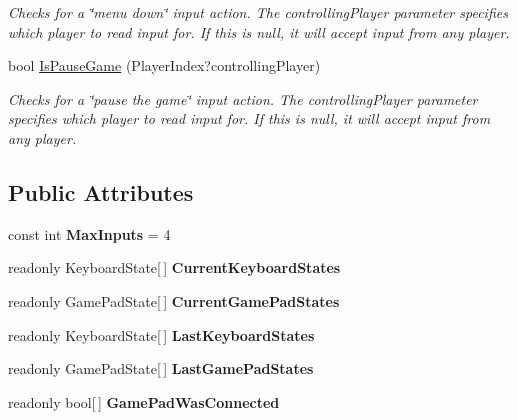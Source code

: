 \begin{DoxyCompactItemize}
\begin{DoxyCompactList}\small\item\em Checks for a \char`\"{}menu down\char`\"{} input action. The controllingPlayer parameter specifies which player to read input for. If this is null, it will accept input from any player. \item\end{DoxyCompactList}\item 
bool \hyperlink{classCityMania_1_1InputState_a3bd8bfe8eb38e6a6730104b22965a752}{IsPauseGame} (PlayerIndex?controllingPlayer)
\begin{DoxyCompactList}\small\item\em Checks for a \char`\"{}pause the game\char`\"{} input action. The controllingPlayer parameter specifies which player to read input for. If this is null, it will accept input from any player. \item\end{DoxyCompactList}\end{DoxyCompactItemize}
\subsection*{Public Attributes}
\begin{DoxyCompactItemize}
\item 
\hypertarget{classCityMania_1_1InputState_ac78cfe30d434938078907e0d40e47aaf}{
const int {\bfseries MaxInputs} = 4}
\label{classCityMania_1_1InputState_ac78cfe30d434938078907e0d40e47aaf}

\item 
\hypertarget{classCityMania_1_1InputState_a5edcfb328a0feb8dcafa0c7765a6a0fa}{
readonly KeyboardState\mbox{[}$\,$\mbox{]} {\bfseries CurrentKeyboardStates}}
\label{classCityMania_1_1InputState_a5edcfb328a0feb8dcafa0c7765a6a0fa}

\item 
\hypertarget{classCityMania_1_1InputState_a08cf87609a3babdb5e763d83cd6ad894}{
readonly GamePadState\mbox{[}$\,$\mbox{]} {\bfseries CurrentGamePadStates}}
\label{classCityMania_1_1InputState_a08cf87609a3babdb5e763d83cd6ad894}

\item 
\hypertarget{classCityMania_1_1InputState_ab602bf4a26c27900aecf452cbefbe631}{
readonly KeyboardState\mbox{[}$\,$\mbox{]} {\bfseries LastKeyboardStates}}
\label{classCityMania_1_1InputState_ab602bf4a26c27900aecf452cbefbe631}

\item 
\hypertarget{classCityMania_1_1InputState_a86f8b5c6bdcf2cba1d39667f65a8f122}{
readonly GamePadState\mbox{[}$\,$\mbox{]} {\bfseries LastGamePadStates}}
\label{classCityMania_1_1InputState_a86f8b5c6bdcf2cba1d39667f65a8f122}

\item 
\hypertarget{classCityMania_1_1InputState_a9604cdb41a7251c0fa68b13ffa28581f}{
readonly bool\mbox{[}$\,$\mbox{]} {\bfseries GamePadWasConnected}}
\label{classCityMania_1_1InputState_a9604cdb41a7251c0fa68b13ffa28581f}

\end{DoxyCompactItemize}


